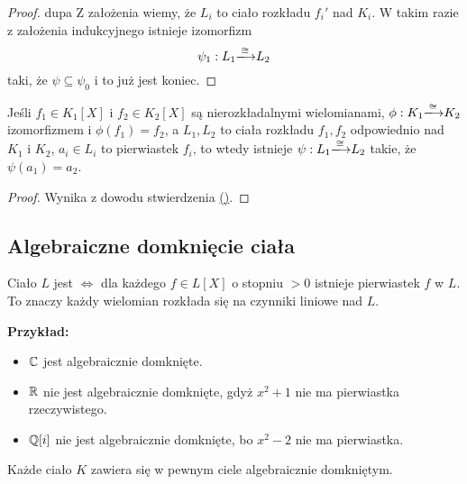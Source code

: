 \begin{proof}{\color{pagColor}dupa}
Z założenia wiemy, że {$L_i$ to ciało rozkładu $f_i'$ nad $K_i$}. W takim razie z założenia indukcyjnego istnieje izomorfizm
$$\psi_1:L_1\isomorphism{}L_2$$
taki, że $\psi\subseteq\psi_0$ i to już jest koniec.
\end{proof}

\begin{conclusion}
    Jeśli $f_1\in K_1[X]$ i $f_2\in K_2[X]$ są nierozkładalnymi wielomianami, $\phi:K_1\isomorphism{}K_2$ izomorfizmem i $\phi(f_1)=f_2$, a $L_1,L_2$ to ciała rozkładu $f_1,f_2$ odpowiednio nad $K_1$ i $K_2$, $a_i\in L_i$ to pierwiastek $f_i$, to wtedy istnieje $\psi:L_1\isomorphism{}L_2$ takie, że $\psi(a_1)=a_2$.
\end{conclusion}

\begin{proof}
Wynika z dowodu stwierdzenia \hyperref[stwierdzenie:wniosek]{{\color{yellow}(\Bat)}}.
\end{proof}

\subsection{Algebraiczne domknięcie ciała}

Ciało $L$ jest  $\iff$ dla każdego $f\in L[X]$ o stopniu $>0$ istnieje pierwiastek $f$ w $L$. To znaczy każdy wielomian rozkłada się na czynniki liniowe nad $L$.

\textbf{Przykład:}
\begin{itemize}
\item$\mathbb{C}$ jest algebraicznie domknięte.
\item $\mathbb{R}$ nie jest algebraicznie domknięte, gdyż $x^2+1$ nie ma pierwiastka rzeczywistego.
\item  $\mathbb{Q}[i]$ nie jest algebraicznie domknięte, bo $x^2-2$ nie ma pierwiastka.
\end{itemize}
\begin{theorem}
    \label{tw:2.3}
    Każde ciało $K$ zawiera się w pewnym ciele algebraicznie domkniętym.
\end{theorem}

